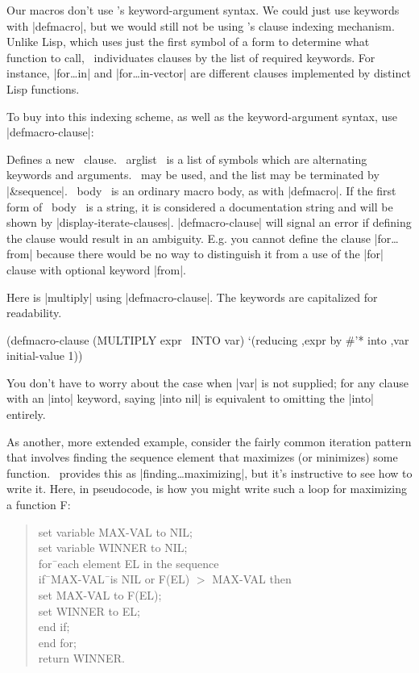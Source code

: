 Our macros don't use \iter's keyword-argument
syntax.  We could just use keywords with |defmacro|, but we would
still not be using \iter's clause indexing mechanism.  Unlike Lisp,
which uses just the first symbol of a form to determine what function
to call, \iter\ individuates clauses by the list of required keywords.
For instance, |for\dots in| and |for\dots in-vector| are different clauses
implemented by distinct Lisp functions.  

To buy into this indexing scheme, as well as the keyword-argument
syntax, use |defmacro-clause|:

\begin{clauses}

Defines a new \iter\ clause.  ~arglist~ is a list of symbols which are
alternating keywords and arguments.  \opt\ may be used, and the list
may be terminated by |\&sequence|.  ~body~ is an ordinary macro body,
as with |defmacro|.  If the first form of ~body~ is a string, it is
considered a documentation string and will be shown by
|display-iterate-clauses|. |defmacro-clause| will signal an error if 
defining the clause would result in an ambiguity.  E.g. you cannot
define the clause |for\dots from| because there would be no way to
distinguish it from a use of the |for| clause with optional keyword |from|.

\end{clauses}

\medskip

Here is |multiply| using |defmacro-clause|.  The keywords are capitalized
for readability.
\begin{program}
(defmacro-clause (MULTIPLY expr \opt\ INTO var)
  `(reducing ,expr by \#'* into ,var initial-value 1))
\end{program}
You don't have to worry about the case when |var| is not supplied; for
any clause with an |into| keyword, saying |into nil| is equivalent to
omitting the |into| entirely.

As another, more extended example, consider the fairly common
iteration pattern that 
involves finding the sequence element that maximizes (or minimizes) some
function.  \iter\ provides this as |finding\dots maximizing|, but it's
instructive to see how to write it.
Here, in pseudocode, is how you might write such a loop for
maximizing a function F:

\begin{quote}
\begin{tabbing}
set variable MAX-VAL to NIL; \\
set variable WINNER to NIL; \\
for\=\ each element EL in the sequence \\
\>  if\=\ MAX-VAL\=\ is NIL or F(EL) $>$ MAX-VAL then \\
\>\>    set MAX-VAL to F(EL); \\
\>\>    set WINNER to EL; \\
\>  end if; \\
end for; \\
return WINNER.
\end{tabbing}
\end{quote}


